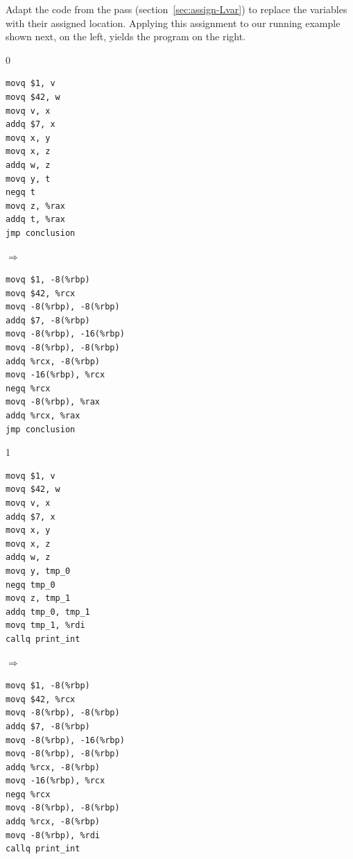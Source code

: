 \documentclass[7x10]{TimesAPriori_MIT}%
\def\racketEd{0}
\def\pythonEd{1}
\providecommand{\BookEdition}{1}
\let\edition\BookEdition
\newcommand{\pythonColor}[0]{}
\numberwithin{theorem}{chapter}
\numberwithin{definition}{chapter}
\numberwithin{equation}{chapter}
\begin{document}
Adapt the code from the  pass
(section~\ref{sec:assign-Lvar}) to replace the variables with their
assigned location. Applying this assignment to our running
example shown next, on the left, yields the program on the right.
\begin{center}
{\if\edition\racketEd      
\begin{minipage}{0.35\textwidth}
\begin{lstlisting}
movq $1, v
movq $42, w
movq v, x
addq $7, x
movq x, y
movq x, z
addq w, z
movq y, t
negq t
movq z, %rax
addq t, %rax
jmp conclusion
\end{lstlisting}
\end{minipage}
$\Rightarrow\qquad$
\begin{minipage}{0.45\textwidth}
\begin{lstlisting}
movq $1, -8(%rbp)
movq $42, %rcx
movq -8(%rbp), -8(%rbp)
addq $7, -8(%rbp)
movq -8(%rbp), -16(%rbp)
movq -8(%rbp), -8(%rbp)
addq %rcx, -8(%rbp)
movq -16(%rbp), %rcx
negq %rcx
movq -8(%rbp), %rax
addq %rcx, %rax
jmp conclusion
\end{lstlisting}
\end{minipage}
\fi}
{\if\edition\pythonEd\pythonColor
\begin{minipage}{0.35\textwidth}
\begin{lstlisting}
movq $1, v
movq $42, w
movq v, x
addq $7, x
movq x, y
movq x, z
addq w, z
movq y, tmp_0
negq tmp_0
movq z, tmp_1
addq tmp_0, tmp_1
movq tmp_1, %rdi
callq print_int
\end{lstlisting}
\end{minipage}
$\Rightarrow\qquad$
\begin{minipage}{0.45\textwidth}
\begin{lstlisting}
movq $1, -8(%rbp)
movq $42, %rcx
movq -8(%rbp), -8(%rbp)
addq $7, -8(%rbp)
movq -8(%rbp), -16(%rbp)
movq -8(%rbp), -8(%rbp)
addq %rcx, -8(%rbp)
movq -16(%rbp), %rcx
negq %rcx
movq -8(%rbp), -8(%rbp)
addq %rcx, -8(%rbp)
movq -8(%rbp), %rdi
callq print_int    
\end{lstlisting}
\end{minipage}
\fi}
\end{center}
\end{document}
